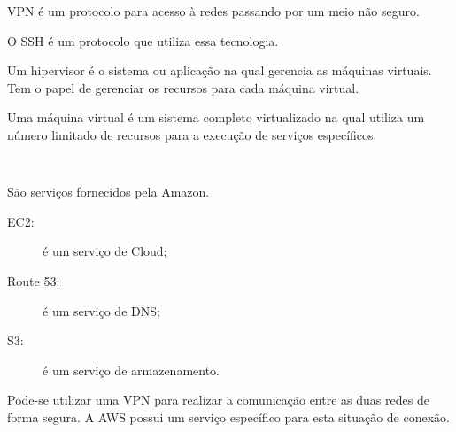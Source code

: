 \documentclass[answers]{exam}
\begin{document}
\begin{questions}
\begin{framed}
VPN é um protocolo para acesso à redes passando por um meio não seguro.

O SSH é um protocolo que utiliza essa tecnologia.
\end{framed}



\begin{framed}
Um hipervisor é o sistema ou aplicação na qual gerencia as máquinas virtuais.
Tem o papel de gerenciar os recursos para cada máquina virtual.

Uma máquina virtual é um sistema completo virtualizado na qual utiliza um número limitado de recursos para a execução de serviços específicos.
\end{framed}



\begin{framed}
\texttt{ }
\end{framed}



\begin{framed}
São serviços fornecidos pela Amazon.

\begin{description}
    \item[EC2:] é um serviço de Cloud;
    \item[Route 53:] é um serviço de DNS;
    \item[S3:] é um serviço de armazenamento.
\end{description}
\end{framed}



\begin{framed}
Pode-se utilizar uma VPN para realizar a comunicação entre as duas redes de forma segura.
A AWS possui um serviço específico para esta situação de conexão.
\end{framed}




\end{questions}
\end{document}
